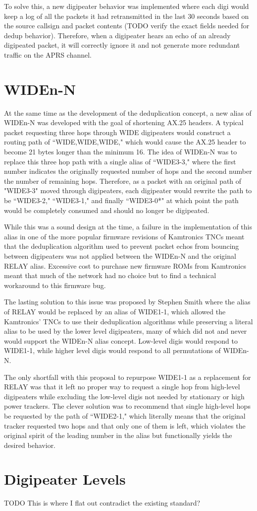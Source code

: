 To solve this, a new digipeater behavior was implemented where each digi would keep a log of
all the packets it had retransmitted in the last 30 seconds based on the source callsign and 
packet contents (TODO verify the exact fields needed for dedup behavior). Therefore, when a digipeater 
hears an echo of an already digipeated packet, it will correctly ignore it and not generate more
redundant traffic on the APRS channel.

\section{WIDEn-N}

At the same time as the development of the deduplication concept, a new alias of WIDEn-N was 
developed with the goal of shortening AX.25 headers. A typical packet requesting three hops through
WIDE digipeaters would construct a routing path of ``WIDE,WIDE,WIDE," which would cause the 
AX.25 header to become 21 bytes longer than the minimum 16. The idea of WIDEn-N was to replace this
three hop path with a single alias of ``WIDE3-3," where the first number indicates the originally
requested number of hops and the second number the number of remaining hops. Therefore, as a packet
with an original path of "WIDE3-3" moved through digipeaters, each digipeater would rewrite the path 
to be ``WIDE3-2," ``WIDE3-1," and finally ``WIDE3-0*" at which point the path would be completely 
consumed and should no longer be digipeated.

While this was a sound design at the time, a failure in the implementation of this alias in one of
the more popular firmware revisions of Kamtronics TNCs meant that the deduplication algorithm used to
prevent packet echos from bouncing between digipeaters was not applied between the WIDEn-N and the 
original RELAY alias. Excessive cost to purchase new firmware ROMs from Kamtronics meant that much
of the network had no choice but to find a technical workaround to this firmware bug.

The lasting solution to this issue was proposed by Stephen Smith where the alias of RELAY would be
replaced by an alias of WIDE1-1, which allowed the Kamtronics' TNCs to use their deduplication
algorithms while preserving a literal alias to be used by the lower level digipeaters, many of which
did not and never would support the WIDEn-N alias concept. Low-level digis would respond to WIDE1-1, 
while higher level digis would respond to all permutations of WIDEn-N.

The only shortfall with this proposal to repurpose WIDE1-1 as a replacement for RELAY was that it
left no proper way to request a single hop from high-level digipeaters while excluding the low-level
digis not needed by stationary or high power trackers. The clever solution was to recommend that single
high-level hops be requested by the path of ``WIDE2-1," which literally means that the original tracker
requested two hops and that only one of them is left, which violates the original spirit of the leading
number in the alias but functionally yields the desired behavior.

\section{Digipeater Levels}

TODO This is where I flat out contradict the existing standard?
